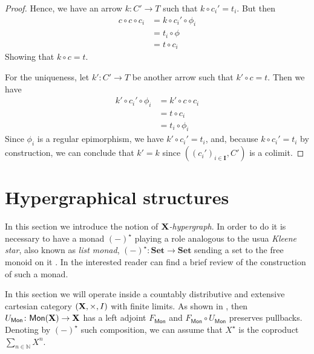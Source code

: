 \documentclass[runningheads,envcountsect]{llncs}
\newcommand{\cat}[1]{\ensuremath{\mathbf{#1}}}
\newcommand{\Set}{\mathbf{Set}}
\def\X{\textbf {\textup{X}}}
\newcommand{\catname}[1]{\textbf{\textup{#1}}}
\newcommand{\mono}[1]{\mathsf{Mon}(\catname{#1})}
\newcommand{\mo}[1]{{#1}_\mathsf{Mon}}
\begin{document}
\begin{proof}
    Hence, we have an arrow $k: C' \to T$ such that $k \circ c_i' = t_i$. But then
    \begin{align*}
        c \circ c \circ c_i &= k \circ c_i' \circ \phi_i \\
                            &= t_i \circ \phi \\
                            &= t \circ c_i
    \end{align*}
    Showing that $k \circ c = t$.

    For the uniqueness, let $k': C' \to T$ be another arrow such that $k' \circ c = t$. Then we have
    \begin{align*}
        k' \circ c_i' \circ \phi_i &= k' \circ c \circ c_i \\
                                   &= t \circ c_i \\
                                   &= t_i \circ \phi_i
    \end{align*}    
    Since $\phi_i$ is a regular epimorphism, we have $k' \circ c_i' = t_i$, and, because $k \circ c_i' = t_i$ by construction, we can conclude that $k'=k$ since $((c_i')_{i \in \cat I}, C')$ is a colimit.
\end{proof}




\section{Hypergraphical structures}\label{sec:hyper}

In this section we introduce the notion of \emph{$\X$-hypergraph}. In order to do it is necessary to have a monad $(-)^\star$ playing a role analogous to the usua \emph{Kleene star}, also known as \emph{list monad}, $(-)^\star\colon \Set\to \Set$ sending a set to the free monoid on it \cite{sakarovitch2009elements,wadler1995monads}. In the interested reader can find a brief review of the construction of such a monad.


\begin{convention}
	In this section we will operate inside a countably distributive and extensive cartesian category $(\X, \times, I)$ with finite limits. As shown in , then $\mo{U}\colon \mono{\X}\to \X$ has a left adjoint $\mo{F}$ and $\mo{F}\circ \mo{U}$ preserves pullbacks. Denoting by $(-)^\star$ such composition, we can assume that $X^\star$ is the coproduct $\sum_{n\in \mathbb{N}}X^n$.
\end{convention}
\end{document}
